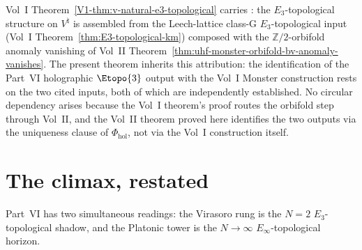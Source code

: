 \begin{remark}
\label{rem:part-vi-moonshine-recovery-scope}
Vol~I Theorem~\ref{V1-thm:v-natural-e3-topological} carries
\ClaimStatusProvedElsewhere: the $E_{3}$-topological structure on
$V^\natural$ is assembled from the Leech-lattice class-G
$E_{3}$-topological input (Vol~I Theorem~\ref{thm:E3-topological-km})
composed with the $\mathbb{Z}/2$-orbifold anomaly vanishing of
Vol~II Theorem~\ref{thm:uhf-monster-orbifold-bv-anomaly-vanishes}.
The present theorem inherits this attribution: the identification of
the Part~VI holographic $\Etopo{3}$ output with the Vol~I Monster
construction rests on the two cited inputs, both of which are
independently established. No circular dependency arises because the
Vol~I theorem's proof routes the orbifold step through Vol~II, and
the Vol~II theorem proved here identifies the two outputs via the
uniqueness clause of $\Phi_{\mathrm{hol}}$, not via the Vol~I
construction itself.
\end{remark}

\section{The climax, restated}
\label{sec:part-vi-climax-restated}

Part~VI has two simultaneous readings: the Virasoro rung is the
$N=2$ $E_3$-topological shadow, and the Platonic tower is the
$N\to\infty$ $E_\infty$-topological horizon.

